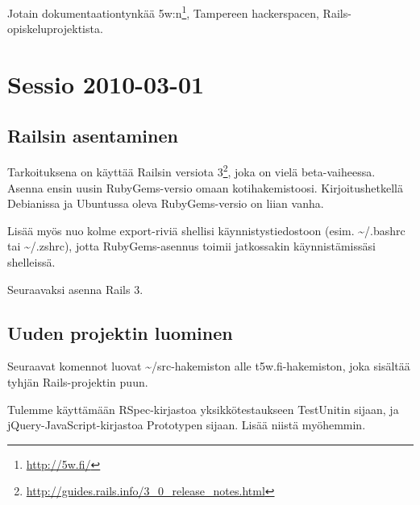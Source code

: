 \documentclass{article}
\title{\en{5w.fi Ruby on Rails workshop}}
\author{Johan Kiviniemi}
\begin{document}
\maketitle

Jotain dokumentaationtynkää 5w:n\footnote{\url{http://5w.fi/}}, Tampereen
hackerspacen, Rails-opiskeluprojektista.

\section{Sessio 2010-03-01}

\subsection{Railsin asentaminen}

\begin{samepage}
  Tarkoituksena on käyttää Railsin versiota
  3\footnote{\url{http://guides.rails.info/3\_0\_release\_notes.html}}, joka on
  vielä beta-vaiheessa. Asenna ensin uusin RubyGems-versio omaan
  kotihakemistoosi. Kirjoitushetkellä Debianissa ja Ubuntussa oleva
  RubyGems-versio on liian vanha.

\end{samepage}

Lisää myös nuo kolme export-riviä shellisi käynnistystiedostoon (esim.
\textasciitilde/.bashrc tai \textasciitilde/.zshrc), jotta RubyGems-asennus
toimii jatkossakin käynnistämissäsi shelleissä.

\begin{samepage}
  Seuraavaksi asenna Rails 3.

\end{samepage}

\subsection{Uuden projektin luominen}

\begin{samepage}
  Seuraavat komennot luovat \textasciitilde/src-hakemiston alle
  t5w.fi-hakemiston, joka sisältää tyhjän Rails-projektin puun.

  Tulemme käyttämään RSpec-kirjastoa yksikkötestaukseen TestUnitin sijaan, ja
  jQuery-JavaScript-kirjastoa Prototypen sijaan. Lisää niistä myöhemmin.

\end{samepage}
\end{document}
